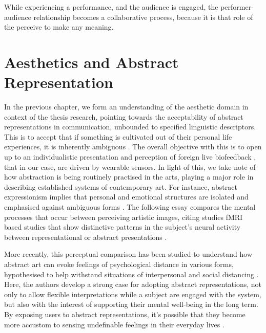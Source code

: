 While experiencing a performance, and the audience is engaged, the performer-audience relationship becomes a collaborative process, because it is that role of the perceive to make any meaning.

\section{Aesthetics and Abstract Representation}
\label{lit_review:abstract}


In the previous chapter, we form an understanding of the aesthetic domain in context of the thesis research, pointing towards the acceptability of abstract representations in communication, unbounded to specified linguistic descriptors. This is to accept that if something is cultivated out of their personal life experiences, it is inherently ambiguous \cite{kaplan_esthetic_1948}. The overall objective with this is to open up to an individualistic presentation and perception of foreign live biofeedback \cite{lux_live_2018}, that in our case, are driven by wearable sensors. In light of this, we take note of how abstraction is being routinely practised in the arts, playing a major role in describing established systems of contemporary art. For instance, abstract expressionism implies that personal and emotional structures are isolated and emphasised against ambiguous forms \cite{pollock_action_2008}. The following essay compares the mental processes that occur between perceiving artistic images, citing studies fMRI based studies that show distinctive patterns in the subject's neural activity between representational or abstract presentations \cite{aviv_what_2014}. 

More recently, this perceptual comparison has been studied to understand how abstract art can evoke feelings of psychological distance in various forms, hypothesised to help withstand situations of interpersonal and social distancing \cite{durkin_objective_2020}. Here, the authors develop a strong case for adopting abstract representations, not only to allow flexible interpretations while a subject are engaged with the system, but also with the interest of supporting their mental well-being in the long term. By exposing users to abstract representations, it's possible that they become more accustom to sensing undefinable feelings in their everyday lives \cite{durkin_objective_2020}.

